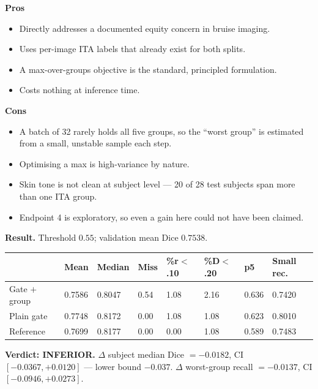 \documentclass[11pt]{article}
\newcommand{\lose}[1]{\textcolor{losered}{#1}}
\newcommand{\pro}[1]{\item[\textcolor{proscol}{$+$}] #1}
\newcommand{\con}[1]{\item[\textcolor{conscol}{$-$}] #1}
\begin{document}
\begin{minipage}[t]{0.475\textwidth}
\textbf{\textcolor{proscol}{Pros}}
\begin{itemize}[leftmargin=1.5em,itemsep=1pt,label={},labelwidth=1em,labelsep=0.4em,align=left]
  \pro{Directly addresses a documented equity concern in bruise imaging.}
  \pro{Uses per-image ITA labels that already exist for both splits.}
  \pro{A max-over-groups objective is the standard, principled formulation.}
  \pro{Costs nothing at inference time.}
\end{itemize}
\end{minipage}\hfill%
\begin{minipage}[t]{0.475\textwidth}
\textbf{\textcolor{conscol}{Cons}}
\begin{itemize}[leftmargin=1.5em,itemsep=1pt,label={},labelwidth=1em,labelsep=0.4em,align=left]
  \con{A batch of 32 rarely holds all five groups, so the ``worst group'' is estimated from a
       small, unstable sample each step.}
  \con{Optimising a max is high-variance by nature.}
  \con{Skin tone is not clean at subject level --- 20 of 28 test subjects span more than one ITA
       group.}
  \con{Endpoint 4 is exploratory, so even a gain here could not have been claimed.}
\end{itemize}
\end{minipage}

\vspace{6pt}
\textbf{Result.} Threshold $0.55$; validation mean Dice $0.7538$.

\begin{center}\small
\begin{tabular}{K q q q q q q M}
\toprule
& \textbf{Mean} & \textbf{Median} & \textbf{Miss} & \textbf{\%r$<$.10} & \textbf{\%D$<$.20} &
\textbf{p5} & \textbf{Small rec.} \\
\midrule
Gate $+$ group & 0.7586 & 0.8047 & 0.54 & 1.08 & 2.16 & 0.636 & 0.7420 \\
Plain gate     & 0.7748 & 0.8172 & 0.00 & 1.08 & 1.08 & 0.623 & 0.8010 \\
Reference      & 0.7699 & 0.8177 & 0.00 & 0.00 & 1.08 & 0.589 & 0.7483 \\
\bottomrule
\end{tabular}
\end{center}

\textbf{Verdict: \lose{INFERIOR}.}
$\Delta$ subject median Dice $=-0.0182$, CI $[-0.0367,+0.0120]$ --- lower bound $-0.037$.
$\Delta$ worst-group recall $=-0.0137$, CI $[-0.0946,+0.0273]$.
\end{document}

